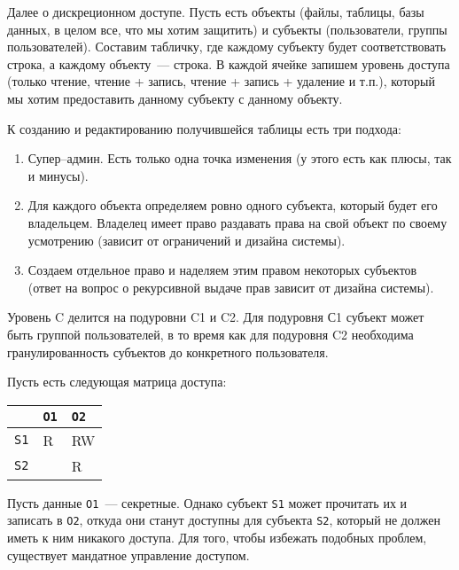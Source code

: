 Далее о дискреционном доступе. Пусть есть объекты (файлы, таблицы, базы данных,
в целом все, что мы хотим защитить) и субъекты (пользователи, группы
пользователей). Составим табличку, где каждому субъекту будет соответствовать
строка, а каждому объекту~--- строка. В каждой ячейке запишем уровень доступа
(только чтение, чтение + запись, чтение + запись + удаление и т.п.), который мы
хотим предоставить данному субъекту с данному объекту.

К созданию и редактированию получившейся таблицы есть три подхода:

\begin{enumerate}
\item
  Супер--админ. Есть только одна точка изменения (у этого есть как плюсы, так и
  минусы).

\item
  Для каждого объекта определяем ровно одного субъекта, который будет его
  владельцем. Владелец имеет право раздавать права на свой объект по своему
  усмотрению (зависит от ограничений и дизайна системы).

\item
  Создаем отдельное право  и наделяем этим правом некоторых
  субъектов (ответ на вопрос о рекурсивной выдаче прав зависит от дизайна
  системы).
\end{enumerate}

\begin{remark}
  Уровень C делится на подуровни C1 и C2. Для подуровня С1 субъект может быть
  группой пользователей, в то время как для подуровня C2 необходима
  гранулированность субъектов до конкретного пользователя.
\end{remark}


Пусть есть следующая матрица доступа:

\begin{table}[h!]
  \centering

  \begin{tabularx}{0.3 \textwidth}{ X | X  X }
                & \texttt{O1} & \texttt{O2} \\ \hline
    \texttt{S1} & R           & RW          \\
    \texttt{S2} &             & R           \\
  \end{tabularx}
\end{table}

Пусть данные \texttt{O1}~--- секретные. Однако субъект \texttt{S1} может
прочитать их и записать в \texttt{O2}, откуда они станут доступны для субъекта
\texttt{S2}, который не должен иметь к ним никакого доступа. Для того, чтобы
избежать подобных проблем, существует мандатное управление доступом.

